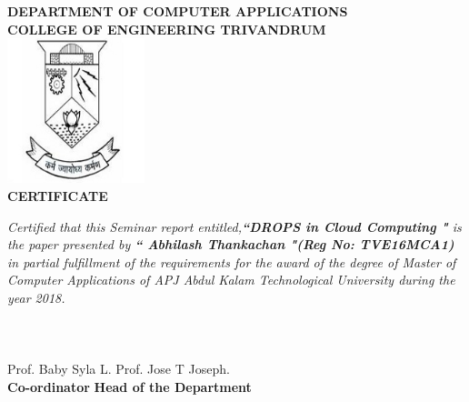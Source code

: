 \begin{titlepage}
\begin{center}
\textbf{DEPARTMENT OF COMPUTER APPLICATIONS}\\[0.5cm]
\textbf{ COLLEGE OF ENGINEERING TRIVANDRUM}\\
[0.5cm]
\vspace{1.2cm}
\includegraphics[width=0.30\textwidth]{./logo}\\
\vspace{0.8cm}
\textbf{CERTIFICATE}\\
\end{center}
\emph{Certified that this Seminar report entitled,\textbf{``DROPS in Cloud Computing "} is the paper presented by \textbf{`` Abhilash Thankachan "(Reg No: TVE16MCA1)} in partial fulfillment of the requirements for the award of the degree of Master of Computer Applications of APJ Abdul Kalam Technological University during the year 2018.}\\\\\\\\
\vspace{0.5cm}
Prof. Baby Syla L.
\hspace{9.5cm}
Prof. Jose T Joseph.\\ 
\hspace{3.9cm} \textbf{Co-ordinator}
\hspace{9.2cm}
\textbf{Head of the Department}

\end{titlepage}
